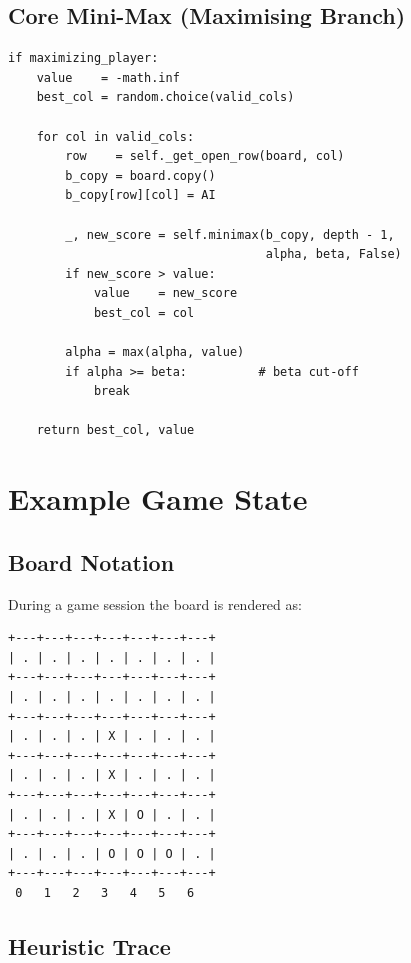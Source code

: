 \documentclass[12pt]{article}
\begin{document}
\subsection{Core Mini-Max (Maximising Branch)}

\begin{lstlisting}[caption={Mini-Max maximising branch with beta cut-off.}]
if maximizing_player:
    value    = -math.inf
    best_col = random.choice(valid_cols)

    for col in valid_cols:
        row    = self._get_open_row(board, col)
        b_copy = board.copy()
        b_copy[row][col] = AI

        _, new_score = self.minimax(b_copy, depth - 1,
                                    alpha, beta, False)
        if new_score > value:
            value    = new_score
            best_col = col

        alpha = max(alpha, value)
        if alpha >= beta:          # beta cut-off
            break

    return best_col, value
\end{lstlisting}

\section{Example Game State}

\subsection{Board Notation}

During a game session the board is rendered as:

\begin{center}
\begin{verbatim}
+---+---+---+---+---+---+---+
| . | . | . | . | . | . | . |
+---+---+---+---+---+---+---+
| . | . | . | . | . | . | . |
+---+---+---+---+---+---+---+
| . | . | . | X | . | . | . |
+---+---+---+---+---+---+---+
| . | . | . | X | . | . | . |
+---+---+---+---+---+---+---+
| . | . | . | X | O | . | . |
+---+---+---+---+---+---+---+
| . | . | . | O | O | O | . |
+---+---+---+---+---+---+---+
 0   1   2   3   4   5   6
\end{verbatim}
\end{center}

\subsection{Heuristic Trace}
\end{document}
